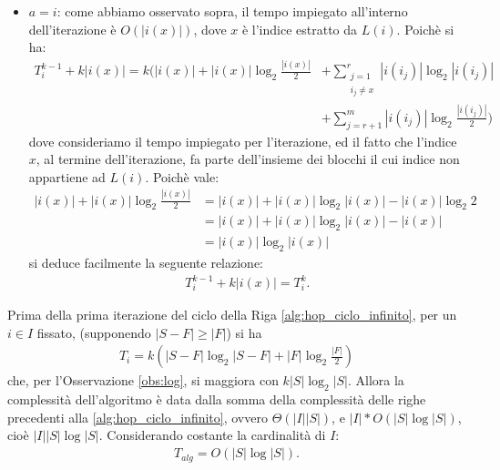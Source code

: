 \begin{proof2}
\begin{itemize}
\begin{itemize}
            \begin{align*}
                c \log_2 c + (b-c) \log_2 \frac{b-c}{2} &\leq c \log_2 \frac{b}{2} + (b-c) \log_2 \frac{b}{2}\\
                &= (c + b - c) \log_2 \frac{b}{2}\\
                &= b \log_2 \frac{b}{2}.
            \end{align*}
        \end{itemize}
        \item $a = i$: come abbiamo osservato sopra, il tempo impiegato all'interno dell'iterazione è $O(|i(x)|)$, dove $x$ è l'indice estratto da $L(i)$. Poichè si ha:
        \begin{align*}
            T_i^{k-1} + k|i(x)| = k \Bigg( |i(x)| + |i(x)|\log_2 \frac{|i(x)|}{2} &+ \sum_{\substack{j = 1\\i_j \neq x}}^r |i(i_j)|\log_2|i(i_j)| \\
            &+ \sum_{j = r+1}^m |i(i_j)|\log_2\frac{|i(i_j)|}{2}\Bigg)
         \end{align*}
        dove consideriamo il tempo impiegato per l'iterazione, ed il fatto che l'indice $x$, al termine dell'iterazione, fa parte dell'insieme dei blocchi il cui indice non appartiene ad $L(i)$. Poichè vale:
        \begin{align*}
            |i(x)| + |i(x)|\log_2 \frac{|i(x)|}{2} &= |i(x)| + |i(x)|\log_2 |i(x)| - |i(x)|\log_2 2\\
            &= |i(x)| + |i(x)|\log_2 |i(x)| - |i(x)|\\
            &= |i(x)|\log_2 |i(x)|
        \end{align*}
        si deduce facilmente la seguente relazione:
        \begin{gather*}
            T_i^{k-1} + k|i(x)| = T_i^k.
        \end{gather*}
    \end{itemize}
    \vspace*{-0.8cm}
\end{proof2}
Prima della prima iterazione del ciclo della Riga \ref{alg:hop_ciclo_infinito}, per un $i \in I$ fissato, (supponendo $|S-F| \geq |F|$) si ha
\begin{gather*}
    T_i = k\left(|S-F|\log_2|S-F| + |F|\log_2\frac{|F|}{2}\right)
\end{gather*}
che, per l'Osservazione \ref{obs:log}, si maggiora con $k |S|\log_2|S|$. Allora la complessità dell'algoritmo è data dalla somma della complessità delle righe precedenti alla \ref{alg:hop_ciclo_infinito}, ovvero $\Theta(|I||S|)$, e $|I| * O(|S|\log|S|)$, cioè $|I||S|\log|S|$. Considerando costante la cardinalità di $I$:
\begin{gather*}
    T_{alg} = O(|S|\log|S|).
\end{gather*}
